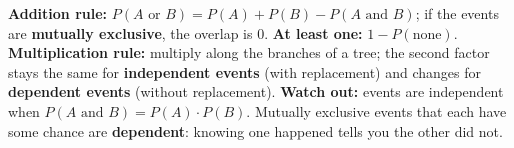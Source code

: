 \documentclass[12pt]{article}
\begin{document}
\vspace{0.14in}

\begin{remindbox}
\small
\textbf{Addition rule:} $P(A \text{ or } B) = P(A) + P(B) - P(A \text{ and } B)$; if the events
are \textbf{mutually exclusive}, the overlap is $0$. \textbf{At least one:}
$1 - P(\text{none})$. \textbf{Multiplication rule:} multiply along the branches of a tree; the
second factor stays the same for \textbf{independent events} (with replacement) and changes for
\textbf{dependent events} (without replacement). \textbf{Watch out:} events are independent when
$P(A \text{ and } B) = P(A) \cdot P(B)$. Mutually exclusive events that each have some chance
are \textbf{dependent}: knowing one happened tells you the other did not.
\end{remindbox}
\end{document}
